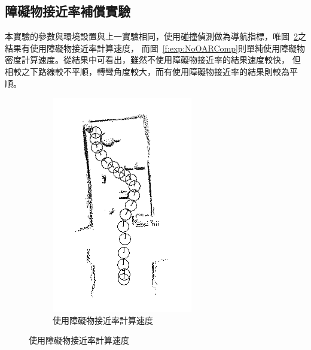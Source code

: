 \subsection{障礙物接近率補償實驗}
本實驗的參數與環境設置與上一實驗相同，使用碰撞偵測做為導航指標，唯圖~\ref{f:exp:OARComp}之結果有使用障礙物接近率計算速度，
而圖~\ref{f:exp:NoOARComp}則單純使用障礙物密度計算速度。從結果中可看出，雖然不使用障礙物接近率的結果速度較快，
但相較之下路線較不平順，轉彎角度較大，而有使用障礙物接近率的結果則較為平順。
\begin{figure}[h!]
	\centering
	\begin{subfigure}[t]{0.48\textwidth}
		\includegraphics[width=\textwidth]{figures/experiments/path_Comp}
		\caption{使用障礙物接近率計算速度}
		\label{f:exp:OARComp}

\end{subfigure}
\end{figure}

